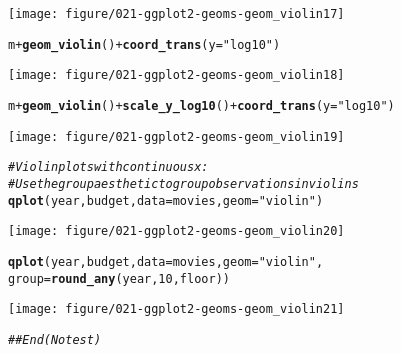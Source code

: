 \documentclass[a4paper,titlepage]{tufte-handout}\usepackage[]{graphicx}\usepackage[]{color}
\makeatletter
\def\maxwidth{ %
  \ifdim\Gin@nat@width>\linewidth
    \linewidth
  \else
    \Gin@nat@width
  \fi
}
\newcommand{\hlnum}[1]{\textcolor[rgb]{0.686,0.059,0.569}{#1}}%
\newcommand{\hlstr}[1]{\textcolor[rgb]{0.192,0.494,0.8}{#1}}%
\newcommand{\hlcom}[1]{\textcolor[rgb]{0.678,0.584,0.686}{\textit{#1}}}%
\newcommand{\hlopt}[1]{\textcolor[rgb]{0,0,0}{#1}}%
\newcommand{\hlstd}[1]{\textcolor[rgb]{0.345,0.345,0.345}{#1}}%
\newcommand{\hlkwc}[1]{\textcolor[rgb]{0.333,0.667,0.333}{#1}}%
\newcommand{\hlkwd}[1]{\textcolor[rgb]{0.737,0.353,0.396}{\textbf{#1}}}%
\newenvironment{kframe}{%
 \def\at@end@of@kframe{}%
 \ifinner\ifhmode%
  \def\at@end@of@kframe{\end{minipage}}%
  \begin{minipage}{\columnwidth}%
 \fi\fi%
 \def\FrameCommand##1{\hskip\@totalleftmargin \hskip-\fboxsep
 \colorbox{shadecolor}{##1}\hskip-\fboxsep
     \hskip-\linewidth \hskip-\@totalleftmargin \hskip\columnwidth}%
 \MakeFramed {\advance\hsize-\width
   \@totalleftmargin\z@ \linewidth\hsize
   \@setminipage}}%
 {\par\unskip\endMakeFramed%
 \at@end@of@kframe}
\newenvironment{knitrout}{}{} %
\makeatother
\begin{document}
\begin{knitrout}
\begin{kframe}
{\ttfamily\noindent\color{warningcolor}{\#\# Warning: position\_dodge requires constant width: output may be incorrect}}\end{kframe}
\texttt{[image: figure/021-ggplot2-geoms-geom\_violin17]} 
\begin{kframe}\begin{alltt}
\hlstd{m} \hlopt{+} \hlkwd{geom_violin}\hlstd{()} \hlopt{+} \hlkwd{coord_trans}\hlstd{(}\hlkwc{y} \hlstd{=} \hlstr{"log10"}\hlstd{)}
\end{alltt}


{\ttfamily\noindent\color{warningcolor}{\#\# Warning: position\_dodge requires constant width: output may be incorrect}}\end{kframe}
\texttt{[image: figure/021-ggplot2-geoms-geom\_violin18]} 
\begin{kframe}\begin{alltt}
\hlstd{m} \hlopt{+} \hlkwd{geom_violin}\hlstd{()} \hlopt{+} \hlkwd{scale_y_log10}\hlstd{()} \hlopt{+} \hlkwd{coord_trans}\hlstd{(}\hlkwc{y} \hlstd{=} \hlstr{"log10"}\hlstd{)}
\end{alltt}


{\ttfamily\noindent\color{warningcolor}{\#\# Warning: position\_dodge requires constant width: output may be incorrect}}\end{kframe}
\texttt{[image: figure/021-ggplot2-geoms-geom\_violin19]} 
\begin{kframe}\begin{alltt}
\hlcom{# Violin plots with continuous x:}
\hlcom{# Use the group aesthetic to group observations in violins}
\hlkwd{qplot}\hlstd{(year, budget,} \hlkwc{data} \hlstd{= movies,} \hlkwc{geom} \hlstd{=} \hlstr{"violin"}\hlstd{)}
\end{alltt}


{\ttfamily\noindent\color{warningcolor}{\#\# Warning: Removed 53573 rows containing non-finite values (stat\_ydensity).}}\end{kframe}
\texttt{[image: figure/021-ggplot2-geoms-geom\_violin20]} 
\begin{kframe}\begin{alltt}
\hlkwd{qplot}\hlstd{(year, budget,} \hlkwc{data} \hlstd{= movies,} \hlkwc{geom} \hlstd{=} \hlstr{"violin"}\hlstd{,}
  \hlkwc{group} \hlstd{=} \hlkwd{round_any}\hlstd{(year,} \hlnum{10}\hlstd{, floor))}
\end{alltt}


{\ttfamily\noindent\color{warningcolor}{\#\# Warning: Removed 53573 rows containing non-finite values (stat\_ydensity).\\\#\# Warning: position\_dodge requires constant width: output may be incorrect}}\end{kframe}
\texttt{[image: figure/021-ggplot2-geoms-geom\_violin21]} 
\begin{kframe}\begin{alltt}
\hlcom{## End(No test)}
\end{alltt}
\end{kframe}
\end{knitrout}
\end{document}
